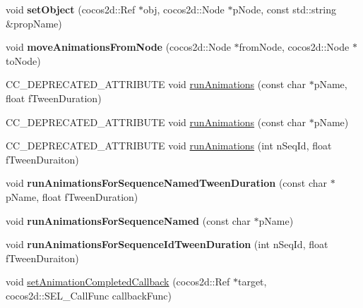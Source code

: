 \begin{DoxyCompactItemize}
\mbox{\label{classcocosbuilder_1_1CCBAnimationManager_a9db3a06f6bccc155cb32529818542f2d}} 
void {\bfseries set\+Object} (cocos2d\+::\+Ref $\ast$obj, cocos2d\+::\+Node $\ast$p\+Node, const std\+::string \&prop\+Name)
\item 
\mbox{\label{classcocosbuilder_1_1CCBAnimationManager_aa38eb04aef3ff59cb639230d924ade72}} 
void {\bfseries move\+Animations\+From\+Node} (cocos2d\+::\+Node $\ast$from\+Node, cocos2d\+::\+Node $\ast$to\+Node)
\item 
C\+C\+\_\+\+D\+E\+P\+R\+E\+C\+A\+T\+E\+D\+\_\+\+A\+T\+T\+R\+I\+B\+U\+TE void \hyperlink{classcocosbuilder_1_1CCBAnimationManager_aa17fe6b5bc1538a4eb3178705d043a51}{run\+Animations} (const char $\ast$p\+Name, float f\+Tween\+Duration)
\item 
C\+C\+\_\+\+D\+E\+P\+R\+E\+C\+A\+T\+E\+D\+\_\+\+A\+T\+T\+R\+I\+B\+U\+TE void \hyperlink{classcocosbuilder_1_1CCBAnimationManager_a0943033ca5e90361444b74f0c1d8a8ec}{run\+Animations} (const char $\ast$p\+Name)
\item 
C\+C\+\_\+\+D\+E\+P\+R\+E\+C\+A\+T\+E\+D\+\_\+\+A\+T\+T\+R\+I\+B\+U\+TE void \hyperlink{classcocosbuilder_1_1CCBAnimationManager_a4c1b1a2f7b02e1666062885f74736340}{run\+Animations} (int n\+Seq\+Id, float f\+Tween\+Duraiton)
\item 
\mbox{\label{classcocosbuilder_1_1CCBAnimationManager_a9da4ff272ad71775d31c8765147508a1}} 
void {\bfseries run\+Animations\+For\+Sequence\+Named\+Tween\+Duration} (const char $\ast$p\+Name, float f\+Tween\+Duration)
\item 
\mbox{\label{classcocosbuilder_1_1CCBAnimationManager_a034d6f983c33894188ac7a759e107957}} 
void {\bfseries run\+Animations\+For\+Sequence\+Named} (const char $\ast$p\+Name)
\item 
\mbox{\label{classcocosbuilder_1_1CCBAnimationManager_af6fe1e2ccf38e4b1362846b04703b56b}} 
void {\bfseries run\+Animations\+For\+Sequence\+Id\+Tween\+Duration} (int n\+Seq\+Id, float f\+Tween\+Duraiton)
\item 
void \hyperlink{classcocosbuilder_1_1CCBAnimationManager_a52729b235eae531b6b4607ca1dca80ab}{set\+Animation\+Completed\+Callback} (cocos2d\+::\+Ref $\ast$target, cocos2d\+::\+S\+E\+L\+\_\+\+Call\+Func callback\+Func)

\end{DoxyCompactItemize}
